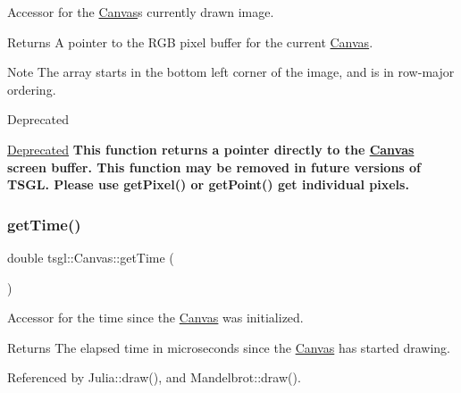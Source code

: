 Accessor for the \hyperlink{classtsgl_1_1_canvas}{Canvas}\textquotesingle{}s currently drawn image. 

\begin{DoxyReturn}{Returns}
A pointer to the R\+GB pixel buffer for the current \hyperlink{classtsgl_1_1_canvas}{Canvas}. 
\end{DoxyReturn}
\begin{DoxyNote}{Note}
The array starts in the bottom left corner of the image, and is in row-\/major ordering. 
\end{DoxyNote}
\begin{DoxyRefDesc}{Deprecated}
\item[\hyperlink{deprecated__deprecated000001}{Deprecated}]{\bfseries This function returns a pointer directly to the \hyperlink{classtsgl_1_1_canvas}{Canvas}\textquotesingle{} screen buffer. This function may be removed in future versions of T\+S\+GL. Please use get\+Pixel() or get\+Point() get individual pixels. }\end{DoxyRefDesc}
\mbox{\label{classtsgl_1_1_canvas_aef462ab48e59571b9c88076bbdc8f0b3}} 
\subsubsection{\texorpdfstring{get\+Time()}{getTime()}}
{\footnotesize\ttfamily double tsgl\+::\+Canvas\+::get\+Time (\begin{DoxyParamCaption}{ }\end{DoxyParamCaption})}



Accessor for the time since the \hyperlink{classtsgl_1_1_canvas}{Canvas} was initialized. 

\begin{DoxyReturn}{Returns}
The elapsed time in microseconds since the \hyperlink{classtsgl_1_1_canvas}{Canvas} has started drawing. 
\end{DoxyReturn}


Referenced by Julia\+::draw(), and Mandelbrot\+::draw().

\mbox{\label{classtsgl_1_1_canvas_a17e0bf3aaa8e73e6808fbe053c31a8a7}} 
